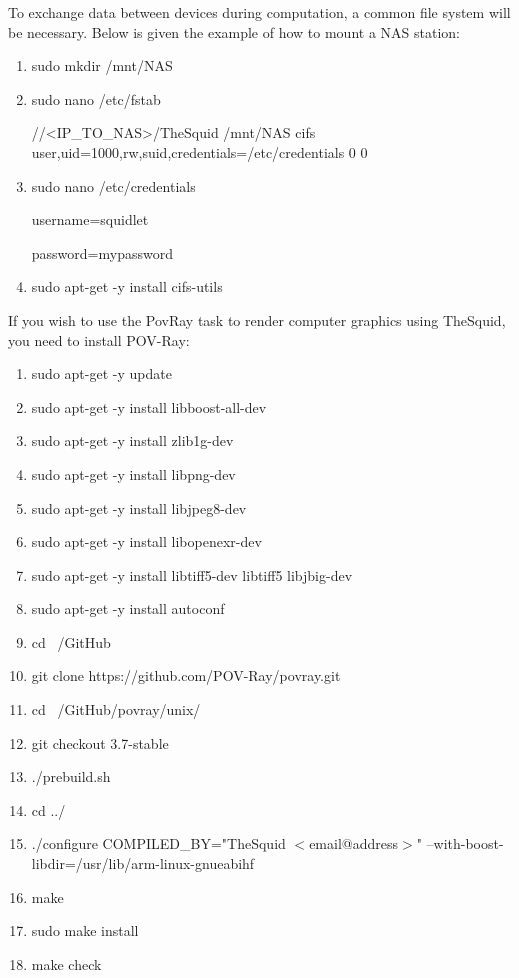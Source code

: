 To exchange data between devices during computation, a common file system will be necessary. Below is given the example of how to mount a NAS station:
\begin{enumerate}
\item \begin{ttfamily}sudo mkdir /mnt/NAS\end{ttfamily}
\item \begin{ttfamily}sudo nano /etc/fstab\end{ttfamily}
\begin{ttfamily}//<IP\_TO\_NAS>/TheSquid /mnt/NAS cifs \\
user,uid=1000,rw,suid,credentials=/etc/credentials 0 0\end{ttfamily}
\item \begin{ttfamily}sudo nano /etc/credentials\end{ttfamily}
\begin{ttfamily}username=squidlet\end{ttfamily}
\begin{ttfamily}password=mypassword\end{ttfamily}
\item \begin{ttfamily}sudo apt-get -y install cifs-utils\end{ttfamily}
\end{enumerate}

If you wish to use the PovRay task to render computer graphics using TheSquid, you need to install POV-Ray:
\begin{enumerate}
\item sudo apt-get -y update
\item sudo apt-get -y install libboost-all-dev
\item sudo apt-get -y install zlib1g-dev
\item sudo apt-get -y install libpng-dev
\item sudo apt-get -y install libjpeg8-dev
\item sudo apt-get -y install libopenexr-dev
\item sudo apt-get -y install libtiff5-dev libtiff5 libjbig-dev
\item sudo apt-get -y install autoconf
\item cd ~/GitHub
\item git clone https://github.com/POV-Ray/povray.git
\item cd ~/GitHub/povray/unix/
\item git checkout 3.7-stable
\item ./prebuild.sh
\item cd ../
\item ./configure COMPILED\_BY="TheSquid $<$email@address$>$" --with-boost-libdir=/usr/lib/arm-linux-gnueabihf
\item make
\item sudo make install
\item make check
\end{enumerate}


